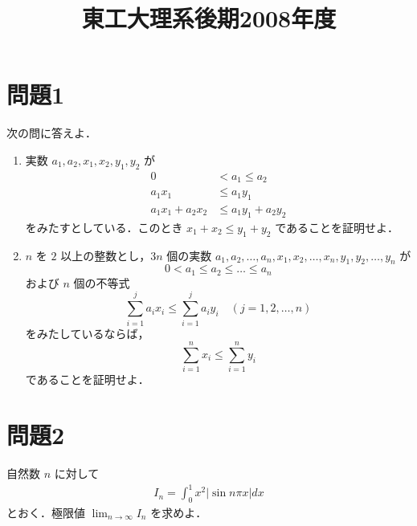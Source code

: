 \documentclass[unicode,12pt, a4paper]{ltjsarticle}%
\title{東工大理系後期2008年度}
\begin{document}
\maketitle
\section{問題1}
次の問に答えよ．
\begin{enumerate}
 \item 実数 $a_1, a_2, x_1, x_2, y_1, y_2$ が
  \begin{align*} 0 &< a_1 \le a_2 \\ a_1 x_1 &\le a_1 y_1 \\ a_1 x_1 + a_2 x_2 &\le a_1 y_1 + a_2 y_2 \end{align*}
  をみたすとしている．このとき $x_1 + x_2 \le y_1 + y_2$ であることを証明せよ．
 \item $n$ を $2$ 以上の整数とし，$3n$ 個の実数 $a_1, a_2, \dots, a_n, x_1, x_2, \dots, x_n, y_1, y_2, \dots, y_n$ が
  \[ 0 < a_1 \le a_2 \le \dots \le a_n \]
  および $n$ 個の不等式
  \[ \sum_{i=1}^j a_i x_i \le \sum_{i=1}^j a_i y_i \quad (j=1, 2, \dots, n) \]
  をみたしているならば，
  \[ \sum_{i=1}^n x_i \le \sum_{i=1}^n y_i \]
  であることを証明せよ．
\end{enumerate}

\section{問題2}
自然数 $n$ に対して
\begin{align*}
   I_n = \int_0^1 x^2 |\sin n\pi x| dx   
\end{align*}
とおく．極限値 $\displaystyle \lim_{n \to \infty} I_n$ を求めよ．
\end{document}
